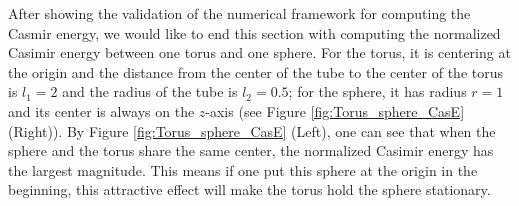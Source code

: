 After showing the validation of the numerical framework for computing the Casmir energy, we would like to end this section with computing the normalized Casimir energy between one torus and one sphere. For the torus, it is centering at the origin and the distance from the center of the tube to the center of the torus is $l_1 = 2$ and the radius of the tube is $l_2 = 0.5$; for the sphere, it has radius $r = 1$ and its center is always on the $z$-axis (see Figure \ref{fig:Torus_sphere_CasE} (Right)). By  Figure \ref{fig:Torus_sphere_CasE} (Left), one can see that when the sphere and the torus share the same center, the normalized Casimir energy has the largest magnitude. This means if one put this sphere at the origin in the beginning, this attractive effect will make the torus hold the sphere stationary. 


